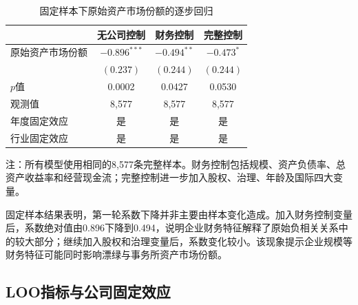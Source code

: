 \documentclass[12pt,a4paper]{article}
\begin{document}
\begin{table}[htbp]
\centering
\caption{固定样本下原始资产市场份额的逐步回归}
\label{tab:same-sample}
\small
\begin{tabular}{lccc}
\toprule
 & 无公司控制 & 财务控制 & 完整控制 \\
\midrule
原始资产市场份额 & $-0.896^{***}$ & $-0.494^{**}$ & $-0.473^{*}$ \\
 & $(0.237)$ & $(0.244)$ & $(0.244)$ \\
$p$值 & 0.0002 & 0.0427 & 0.0530 \\
观测值 & 8,577 & 8,577 & 8,577 \\
年度固定效应 & 是 & 是 & 是 \\
行业固定效应 & 是 & 是 & 是 \\
\bottomrule
\end{tabular}

\begin{minipage}{0.93\textwidth}
\footnotesize 注：所有模型使用相同的8,577条完整样本。财务控制包括规模、资产负债率、总资产收益率和经营现金流；完整控制进一步加入股权、治理、年龄及国际四大变量。
\end{minipage}
\end{table}

固定样本结果表明，第一轮系数下降并非主要由样本变化造成。加入财务控制变量后，系数绝对值由0.896下降到0.494，说明企业财务特征解释了原始负相关关系中的较大部分；继续加入股权和治理变量后，系数变化较小。该现象提示企业规模等财务特征可能同时影响漂绿与事务所资产市场份额。

\subsection{LOO指标与公司固定效应}
\end{document}
